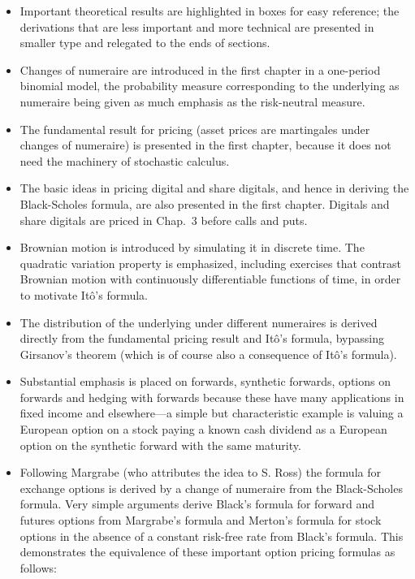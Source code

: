 \begin{itemize}
\item Important theoretical results are highlighted in boxes for easy reference; the derivations that are less important and more technical are presented in smaller type and relegated to the ends of sections.
\item Changes of numeraire are introduced in the first chapter in a one-period binomial model, the probability measure corresponding to the underlying as numeraire being given as much emphasis as the risk-neutral measure. 
\item The fundamental result for pricing (asset prices are martingales under changes of numeraire) is presented in the first chapter, because it does not need the machinery of  stochastic calculus.
\item The basic ideas in pricing digital and share digitals, and hence in deriving the Black-Scholes formula, are also presented in the first chapter.  Digitals and share digitals are priced in Chap.~3 before calls and puts.
\item Brownian motion is introduced by simulating it in discrete time.  The quadratic variation property is emphasized, including exercises that contrast Brownian motion with continuously differentiable functions of time, in order to motivate It\^o's formula.
\item The distribution of the underlying under different numeraires is derived directly from the fundamental pricing result and It\^o's formula, bypassing Girsanov's theorem (which is of course also a consequence of It\^o's formula).
\item Substantial emphasis is placed on forwards, synthetic forwards, options on forwards and hedging with forwards because these have many applications in fixed income and elsewhere---a simple but characteristic example is valuing a European option on a stock paying a known cash dividend as a European option on the synthetic forward with the same maturity.
\item Following Margrabe \cite{Margrabe} (who attributes the idea to S. Ross) the formula for exchange options is derived by a change of numeraire from the Black-Scholes formula.  Very simple  arguments derive Black's formula for forward and futures options from Margrabe's formula and Merton's formula for stock options in the absence of a constant risk-free rate from Black's formula.  This demonstrates the  equivalence of these important option pricing formulas as follows:
\begin{align*}

\end{align*}
\end{itemize}
